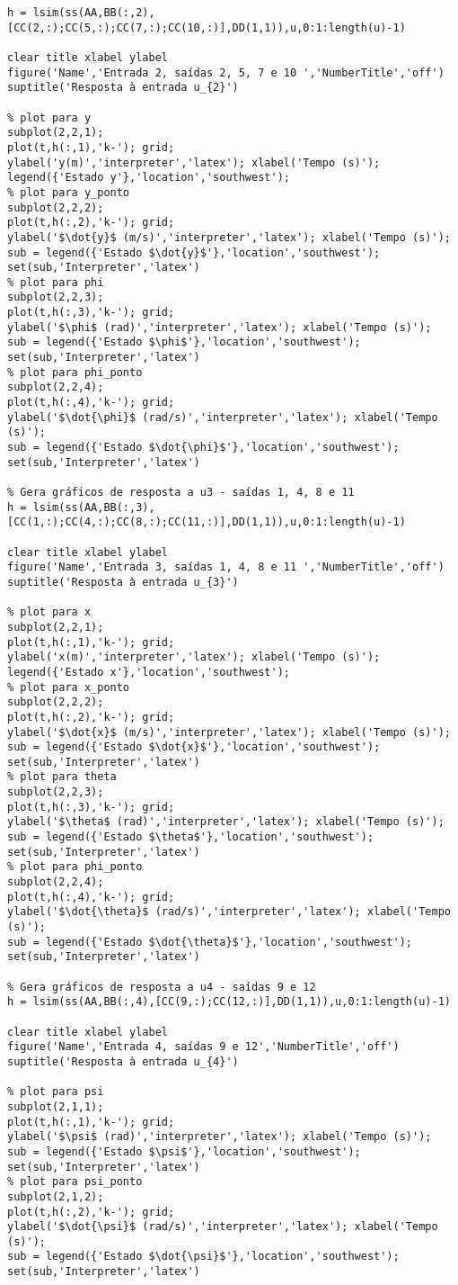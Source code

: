 \begin{lstlisting}[inputencoding=latin1]
% Gera gráficos de resposta a u2
h = lsim(ss(AA,BB(:,2),[CC(2,:);CC(5,:);CC(7,:);CC(10,:)],DD(1,1)),u,0:1:length(u)-1)

clear title xlabel ylabel
figure('Name','Entrada 2, saídas 2, 5, 7 e 10 ','NumberTitle','off')
suptitle('Resposta à entrada u_{2}')

% plot para y
subplot(2,2,1);
plot(t,h(:,1),'k-'); grid;
ylabel('y(m)','interpreter','latex'); xlabel('Tempo (s)');
legend({'Estado y'},'location','southwest');
% plot para y_ponto
subplot(2,2,2);
plot(t,h(:,2),'k-'); grid;
ylabel('$\dot{y}$ (m/s)','interpreter','latex'); xlabel('Tempo (s)');
sub = legend({'Estado $\dot{y}$'},'location','southwest');
set(sub,'Interpreter','latex')
% plot para phi
subplot(2,2,3);
plot(t,h(:,3),'k-'); grid;
ylabel('$\phi$ (rad)','interpreter','latex'); xlabel('Tempo (s)');
sub = legend({'Estado $\phi$'},'location','southwest');
set(sub,'Interpreter','latex')
% plot para phi_ponto
subplot(2,2,4);
plot(t,h(:,4),'k-'); grid;
ylabel('$\dot{\phi}$ (rad/s)','interpreter','latex'); xlabel('Tempo (s)');
sub = legend({'Estado $\dot{\phi}$'},'location','southwest');
set(sub,'Interpreter','latex')

% Gera gráficos de resposta a u3 - saídas 1, 4, 8 e 11
h = lsim(ss(AA,BB(:,3),[CC(1,:);CC(4,:);CC(8,:);CC(11,:)],DD(1,1)),u,0:1:length(u)-1)

clear title xlabel ylabel
figure('Name','Entrada 3, saídas 1, 4, 8 e 11 ','NumberTitle','off')
suptitle('Resposta à entrada u_{3}')

% plot para x
subplot(2,2,1);
plot(t,h(:,1),'k-'); grid;
ylabel('x(m)','interpreter','latex'); xlabel('Tempo (s)');
legend({'Estado x'},'location','southwest');
% plot para x_ponto
subplot(2,2,2);
plot(t,h(:,2),'k-'); grid;
ylabel('$\dot{x}$ (m/s)','interpreter','latex'); xlabel('Tempo (s)');
sub = legend({'Estado $\dot{x}$'},'location','southwest');
set(sub,'Interpreter','latex')
% plot para theta
subplot(2,2,3);
plot(t,h(:,3),'k-'); grid;
ylabel('$\theta$ (rad)','interpreter','latex'); xlabel('Tempo (s)');
sub = legend({'Estado $\theta$'},'location','southwest');
set(sub,'Interpreter','latex')
% plot para phi_ponto
subplot(2,2,4);
plot(t,h(:,4),'k-'); grid;
ylabel('$\dot{\theta}$ (rad/s)','interpreter','latex'); xlabel('Tempo (s)');
sub = legend({'Estado $\dot{\theta}$'},'location','southwest');
set(sub,'Interpreter','latex')

% Gera gráficos de resposta a u4 - saídas 9 e 12
h = lsim(ss(AA,BB(:,4),[CC(9,:);CC(12,:)],DD(1,1)),u,0:1:length(u)-1)

clear title xlabel ylabel
figure('Name','Entrada 4, saídas 9 e 12','NumberTitle','off')
suptitle('Resposta à entrada u_{4}')

% plot para psi
subplot(2,1,1);
plot(t,h(:,1),'k-'); grid;
ylabel('$\psi$ (rad)','interpreter','latex'); xlabel('Tempo (s)');
sub = legend({'Estado $\psi$'},'location','southwest');
set(sub,'Interpreter','latex')
% plot para psi_ponto
subplot(2,1,2);
plot(t,h(:,2),'k-'); grid;
ylabel('$\dot{\psi}$ (rad/s)','interpreter','latex'); xlabel('Tempo (s)');
sub = legend({'Estado $\dot{\psi}$'},'location','southwest');
set(sub,'Interpreter','latex')

\end{lstlisting}